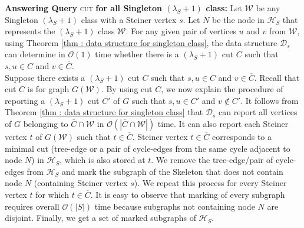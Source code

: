 \documentclass[letterpaper,11pt]{article}
\begin{document}
\noindent
\textbf{Answering Query} \textsc{cut} \textbf{for all Singleton $(\lambda_S+1)$ class:} Let ${\mathcal W}$ be any Singleton $(\lambda_S+1)$ class with a Steiner vertex $s$. Let $N$ be the node in ${\mathcal H}_S$ that represents the $(\lambda_S+1)$ class ${\mathcal W}$. For any given pair of vertices $u$ and $v$ from ${\mathcal W}$, using Theorem \ref{thm : data structure for singleton class}, the data structure ${\mathcal D}_s$ can determine in ${\mathcal O}(1)$ time whether there is a $(\lambda_S+1)$ cut $C$ such that $s,u\in C$ and $v\in \overline{C}$. \\ Suppose there exists a $(\lambda_S+1)$ cut $C$ such that $s,u\in C$ and $v\in \overline{C}$. Recall that cut $C$ is for graph $G({\mathcal W})$. By using cut $C$, we now explain the procedure of reporting a $(\lambda_S+1)$ cut $C'$ of $G$ such that $s,u\in C'$ and $v\notin C'$.
It follows from Theorem \ref{thm : data structure for singleton class} that ${\mathcal D}_s$ can report all vertices of $G$ belonging to $\overline{C}\cap {\mathcal W}$ in ${\mathcal O}(|\overline{C}\cap {\mathcal W}|)$ time. It can also report each Steiner vertex $t$ of $G({\mathcal W})$ such that  $t\in \overline{C}$. Steiner vertex $t\in \overline{C}$ corresponds to a minimal cut (tree-edge or a pair of cycle-edges from the same cycle adjacent to node $N$) in ${\mathcal H}_S$, which is also stored at $t$. We remove the tree-edge/pair of cycle-edges from ${\mathcal H}_S$ and mark the subgraph of the Skeleton that does not contain node $N$ (containing Steiner vertex $s$). We repeat this process for every Steiner vertex $t$ for which $t\in  \overline{C}$. It is easy to observe that marking of every subgraph requires overall ${\mathcal O}(|S|)$ time because subgraphs not containing node $N$ are disjoint. Finally, we get a set of marked subgraphs of ${\mathcal H}_S$.
\end{document}
